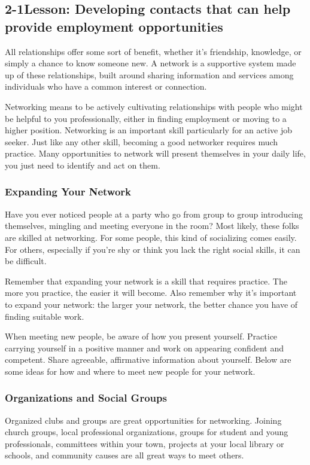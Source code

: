 \pagebreak \subsection*{2-1\quad Lesson: Developing contacts that can help provide employment opportunities}
All relationships offer some sort of benefit, whether it's friendship, knowledge, or simply a chance to know someone new. A network is a supportive system made up of these relationships, built around sharing information and services among individuals who have a common interest or connection.

Networking means to be actively cultivating relationships with people who might be helpful to you professionally, either in finding employment or moving to a higher position. Networking is an important skill particularly for an active job seeker. Just like any other skill, becoming a good networker requires much practice. Many opportunities to network will present themselves in your daily life, you just need to identify and act on them.

\subsubsection*{Expanding Your Network}
Have you ever noticed people at a party who go from group to group introducing themselves, mingling and meeting everyone in the room? Most likely, these folks are skilled at networking. For some people, this kind of socializing comes easily. For others, especially if you're shy or think you lack the right social skills, it can be difficult.

Remember that expanding your network is a skill that requires practice. The more you practice, the easier it will become. Also remember why it's important to expand your network: the larger your network, the better chance you have of finding suitable work.

When meeting new people, be aware of how you present yourself. Practice carrying yourself in a positive manner and work on appearing confident and competent. Share agreeable, affirmative information about yourself.
Below are some ideas for how and where to meet new people for your network. 
\subsubsection*{Organizations and Social Groups}
Organized clubs and groups are great opportunities for networking. Joining church groups, local professional organizations, groups for student and young professionals, committees within your town, projects at your local library or schools, and community causes are all great ways to meet others.
